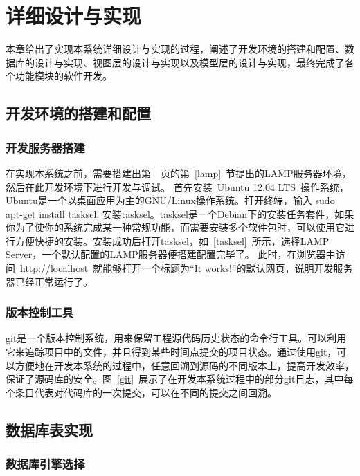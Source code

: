 
\chapter{详细设计与实现}

本章给出了实现本系统详细设计与实现的过程，阐述了开发环境的搭建和配置、数据库的设计与实现、视图层的设计与实现以及模型层的设计与实现，最终完成了各个功能模块的软件开发。

\section{开发环境的搭建和配置}

\subsection{开发服务器搭建}

在实现本系统之前，需要搭建出第~\pageref{lamp}~页的第~\ref{lamp}~节提出的LAMP服务器环境，然后在此开发环境下进行开发与调试。
首先安装~Ubuntu 12.04 LTS~操作系统，Ubuntu是一个以桌面应用为主的GNU/Linux操作系统。打开终端，输入
sudo apt-get install tasksel, 安装tasksel。tasksel是一个Debian下的安装任务套件，如果你为了使你的系统完成某一种常规功能，而需要安装多个软件包时，可以使用它进行方便快捷的安装。安装成功后打开tasksel，如~\ref{tasksel}~所示，选择LAMP Server，一个默认配置的LAMP服务器便搭建配置完毕了。
此时，在浏览器中访问~http://localhost~就能够打开一个标题为“It works!”的默认网页，说明开发服务器已经正常运行了。 

\subsection{版本控制工具}
git是一个版本控制系统，用来保留工程源代码历史状态的命令行工具。可以利用它来追踪项目中的文件，并且得到某些时间点提交的项目状态。通过使用git，可以方便地在开发本系统的过程中，任意回溯到源码的不同版本上，提高开发效率，保证了源码库的安全。图~\ref{git}~展示了在开发本系统过程中的部分git日志，其中每个条目代表对代码库的一次提交，可以在不同的提交之间回溯。
\section{数据库表实现}
\subsection{数据库引擎选择}

